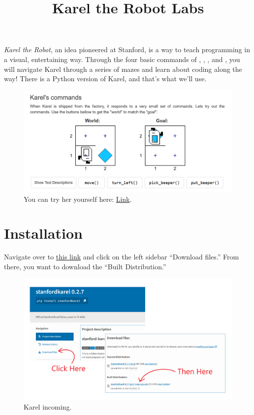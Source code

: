 \documentclass[12pt]{scrartcl}
\title{\vspace{-2em} Karel the Robot Labs}
\author{}
\date{}
\begin{document}
\maketitle
\vspace{-6em}

\textit{Karel the Robot}, an idea pioneered at Stanford, is a way to teach programming in a visual, entertaining way. Through the four basic commands of , , , and , you will navigate Karel through a series of mazes and learn about coding along the way! There is a Python version of Karel, and that's what we'll use.

\begin{figure}[H]
    \centering
    \includegraphics[scale=0.5]{Karel Demonstration.png}
    \caption*{You can try her yourself here: \href{https://compedu.stanford.edu/karel-reader/docs/python/en/chapter1.html}{Link}.}
\end{figure}

\section*{Installation}
Navigate over to \href{https://pypi.org/project/stanfordkarel/#description}{this link} and click on the left sidebar ``Download files.'' From there, you want to download the ``Built Distribution.''

\begin{figure}[H]
    \centering
    \includegraphics[scale=0.25]{Download It.png}
    \caption*{Karel incoming.}
\end{figure}
\end{document}
